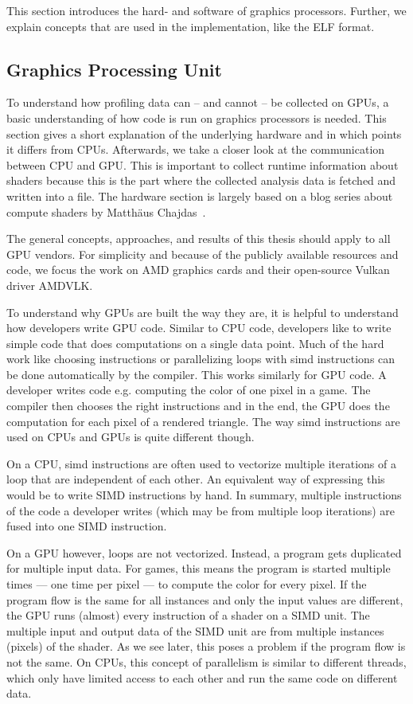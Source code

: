 \clearpage
{}
This section introduces the hard- and software of graphics processors.
Further, we explain concepts that are used in the implementation, like the ELF format.

\subsection{Graphics Processing Unit}
To understand how profiling data can -- and cannot -- be collected on GPUs, a basic understanding of how code is run on graphics processors is needed.
This section gives a short explanation of the underlying hardware and in which points it differs from CPUs.
Afterwards, we take a closer look at the communication between CPU and GPU. This is important to collect runtime information about shaders because this is the part where the collected analysis data is fetched and written into a file.
The hardware section is largely based on a blog series about compute shaders by Matthäus Chajdas~\cite{Chajdas2018}.

The general concepts, approaches, and results of this thesis should apply to all GPU vendors. For simplicity and because of the publicly available resources and code, we focus the work on AMD graphics cards and their open-source Vulkan driver AMDVLK.

To understand why GPUs are built the way they are, it is helpful to understand how developers write GPU code. Similar to CPU code, developers like to write simple code that does computations on a single data point. Much of the hard work like choosing instructions or parallelizing loops with \gls{simd} instructions can be done automatically by the compiler. This works similarly for GPU code. A developer writes code e.g. computing the color of one pixel in a game. The compiler then chooses the right instructions and in the end, the GPU does the computation for each pixel of a rendered triangle. The way \gls{simd} instructions are used on CPUs and GPUs is quite different though.

On a CPU, \gls{simd} instructions are often used to vectorize multiple iterations of a loop that are independent of each other. An equivalent way of expressing this would be to write SIMD instructions by hand. In summary, multiple instructions of the code a developer writes (which may be from multiple loop iterations) are fused into one SIMD instruction.

On a GPU however, loops are not vectorized. Instead, a program gets duplicated for multiple input data.
For games, this means the program is started multiple times --- one time per pixel --- to compute the color for every pixel.
If the program flow is the same for all instances and only the input values are different, the GPU runs (almost) every instruction of a shader on a SIMD unit.
The multiple input and output data of the SIMD unit are from multiple instances (pixels) of the shader.
As we see later, this poses a problem if the program flow is not the same.
On CPUs, this concept of parallelism is similar to different threads, which only have limited access to each other and run the same code on different data.


